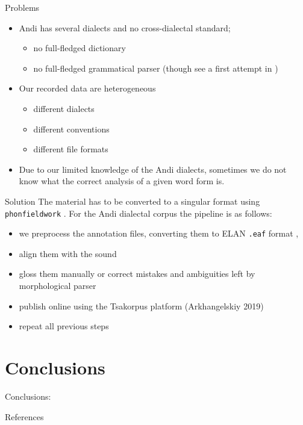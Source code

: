 \documentclass[
  ignorenonframetext,
]{beamer}
\newif\ifbibliography
\providecommand{\tightlist}{%
  \setlength{\itemsep}{0pt}\setlength{\parskip}{0pt}}
\begin{document}
\begin{frame}{Problems}
\protect\hypertarget{problems}{}
\begin{itemize}
\tightlist
\item
  Andi has several dialects and no cross-dialectal standard;

  \begin{itemize}
  \tightlist
  \item
    no full-fledged dictionary
  \item
    no full-fledged grammatical parser (though see a first attempt in
    \citep{buntyakova22})
  \end{itemize}
\item
  Our recorded data are heterogeneous

  \begin{itemize}
  \tightlist
  \item
    different dialects
  \item
    different conventions
  \item
    different file formats
  \end{itemize}
\item
  Due to our limited knowledge of the Andi dialects, sometimes we do not
  know what the correct analysis of a given word form is.
\end{itemize}
\end{frame}

\begin{frame}[fragile]{Solution}
\protect\hypertarget{solution}{}
The material has to be converted to a singular format using
\texttt{phonfieldwork} \citep{moroz20}. For the Andi dialectal corpus
the pipeline is as follows:

\begin{itemize}
\tightlist
\item
  we preprocess the annotation files, converting them to ELAN
  \texttt{.eaf} format \citep{wittenburg06},
\item
  align them with the sound
\item
  gloss them manually or correct mistakes and ambiguities left by
  morphological parser
\item
  publish online using the Tsakorpus platform (Arkhangelskiy 2019)
\item
  repeat all previous steps
\end{itemize}
\end{frame}

\hypertarget{conclusions}{%
\section{\texorpdfstring{\color{colorwhite}
Conclusions}{ Conclusions}}\label{conclusions}}

\begin{frame}{Conclusions:}
\protect\hypertarget{conclusions-1}{}
\end{frame}

\renewcommand\refname{References}
\begin{frame}[allowframebreaks]{References}
  \bibliographytrue
  
\end{frame}
\end{document}
